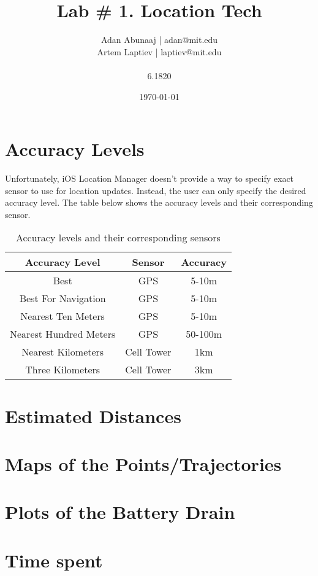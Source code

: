 \documentclass{lab}
\title{Lab \# 1. Location Tech} %
\author{Adan Abunaaj | adan@mit.edu \\ Artem Laptiev | laptiev@mit.edu \\\\ 6.1820} %
\date{\today} %
\begin{document}
\maketitle

\newpage

\section{Accuracy Levels}

Unfortunately, iOS Location Manager doesn't provide a way to specify exact sensor to use for location updates. Instead, the user can only specify the desired accuracy level. The table below shows the accuracy levels and their corresponding sensor.

\begin{table}[h!]
    \centering
    \begin{tabular}{|c|c|c|}
        \hline
        Accuracy Level & Sensor & Accuracy \\ \hline
        Best & GPS & 5-10m \\ \hline
        Best For Navigation & GPS & 5-10m \\ \hline
        Nearest Ten Meters & GPS & 5-10m \\ \hline
        Nearest Hundred Meters & GPS & 50-100m \\ \hline
        Nearest Kilometers & Cell Tower & 1km \\ \hline
        Three Kilometers & Cell Tower & 3km \\ \hline
    \end{tabular}
    \caption{Accuracy levels and their corresponding sensors}
    \label{tab:accuracy}
\end{table}

\section{Estimated Distances}

\section{Maps of the Points/Trajectories}

\section{Plots of the Battery Drain}

\section{Time spent}
\end{document}
